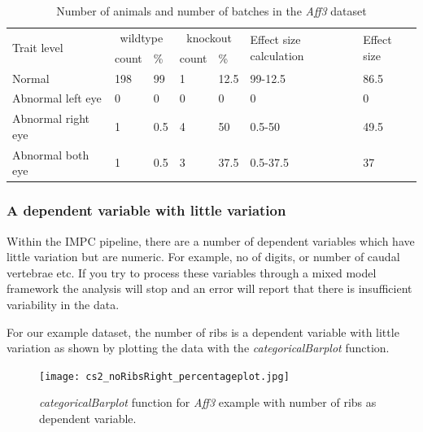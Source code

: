 \documentclass[12pt,a4paper]{article}
\begin{document}
\begin{table}[!h]
\begin{center}
\begin{tabular}{| l | l | l | l | l | l | l| }
  \hline
\multirow{2}{*}{Trait level}&\multicolumn{2}{c}{wildtype}&\multicolumn{2}{c}{knockout}&\multirow{2}{*}{Effect size calculation}&\multirow{2}{*}{Effect size}\\
		     &count& \%			    &count& \%                   &                                        &\\\hline 
Normal &198& 99			    &1& 12.5                   &          99-12.5                              &86.5\\ 
Abnormal left eye&0& 0			    &0& 0                   &          0                              &0\\ 
Abnormal right eye&1& 0.5			    &4& 50                   &          0.5-50                             &49.5\\ 
Abnormal both eye&1& 0.5			    &3& 37.5                   &          0.5-37.5                             &37\\ 
\hline  
\end{tabular}
\caption{Number of animals and number of batches in the \textit{Aff3} dataset}\label{table:10}
\end{center}
\end{table}

\subsubsection{A dependent variable with little variation}

Within the IMPC pipeline, there are a number of dependent variables which have little variation but are numeric. 
For example, no of digits, or number of caudal vertebrae etc.  
If you try to process these variables through a mixed model framework the analysis will stop and an error will report that there is insufficient variability in the data. 

For our example dataset, the number of ribs is a dependent variable with little variation as shown by plotting the data with the \textit{categoricalBarplot} function.

\begin{figure}[H]%
\centerline{\texttt{[image: cs2\_noRibsRight\_percentageplot.jpg]}}
\caption{\textit{categoricalBarplot} function for \textit{Aff3} example with number of ribs as dependent variable.}\label{fig:25}
\end{figure}
\end{document}
